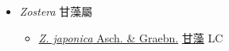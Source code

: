 
  \begin{itemize}
 \item[] \textit{Zostera} 甘藻屬
                    
  \begin{itemize}
        \item[] \href{http://www.theplantlist.org/tpl1.1/search?q=Zostera+japonica}{\textit{Z. japonica} Asch. \& Graebn.}   \href{\detokenize{http://taibnet.sinica.edu.tw/chi/taibnet_species_list.php?T2=甘藻&T2_new_value=true&fr=y}}{甘藻} LC
  \end{itemize}
  \end{itemize}
